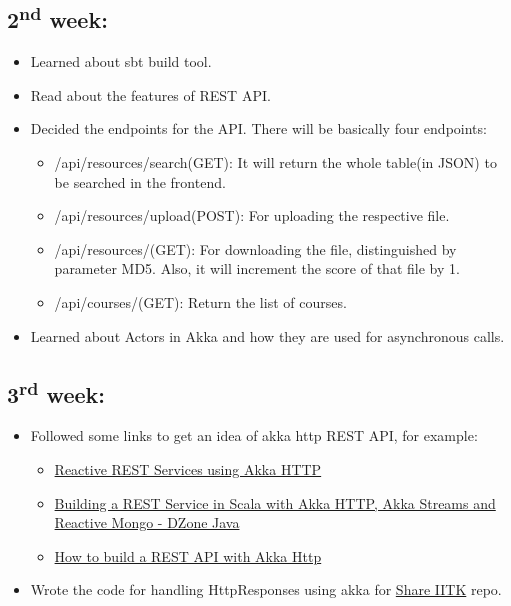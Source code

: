 \documentclass{article}
\begin{document}
\subsection*{2\textsuperscript{nd} week:}
\begin{itemize}
	\item Learned about sbt build tool.
    \item Read about the features of REST API.
    \item Decided the endpoints for the API. There will be basically four endpoints:
    	\begin{itemize}
    		\item /api/resources/search(GET): It will return the whole table(in JSON) to be searched in the frontend.
            \item /api/resources/upload(POST): For uploading the respective file.
            \item /api/resources/(GET): For downloading the file, distinguished by parameter MD5. Also, it will increment the score of that file by 1.
            \item /api/courses/(GET): Return the list of courses.
     	\end{itemize}
    \item Learned about Actors in Akka and how they are used for asynchronous calls.
	\end{itemize}
\subsection*{3\textsuperscript{rd} week:}
\begin{itemize}
	\item Followed some links to get an idea of akka http REST API, for example:
    	\begin{itemize}
        	\item \href{https://spindance.com/reactive-rest-services-akka-http/}{Reactive REST Services using Akka HTTP}
            \item \href{https://dzone.com/articles/building-rest-service-scala}{Building a REST Service in Scala with Akka HTTP, Akka Streams and Reactive Mongo - DZone Java}
            \item \href{https://danielasfregola.com/2016/02/07/how-to-build-a-rest-api-with-akka-http/}{How to build a REST API with Akka Http}
	\end{itemize}
	\item Wrote the code for handling HttpResponses using akka for \href{https://github.com/abhayptp/share-iitk}{Share IITK} repo.
    
\end{itemize}
\end{document}

